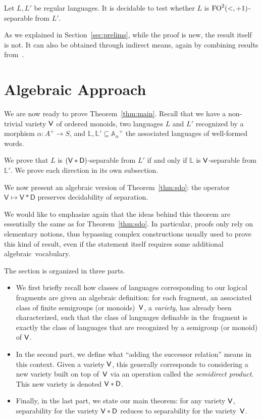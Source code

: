 \documentclass[a4paper,USenglish]{lipics}
\newcommand\Abb{\ensuremath{\mathbb{A}}\xspace}
\newcommand\Lbb{\ensuremath{\mathbb{L}}\xspace}
\newcommand\Vbf{\ensuremath{{\sf V}}\xspace}
\newcommand\Dbf{\ensuremath{{\sf D}}\xspace}
\newcommand{\fodp}{\ensuremath{\textup{FO}^2(<,+1)}\xspace}
\newcommand\wfA{\ensuremath{\Abb_\alpha}\xspace}
\theoremstyle{plain}
\begin{document}
\begin{corollary} \label{cor:dodp}
  Let $L,L'$ be regular languages. It is decidable to test whether $L$
  is \fodp-separable from $L'$.
\end{corollary}

As we explained in Section~\ref{sec:prelims}, while the proof is new, the
result itself is not. It can also be obtained through indirect means, again by
combining results from~\cite{MR1709911,Steinberg:delay-pointlikes:2001}.




\section{Algebraic Approach}
\label{sec:algebra}


\medskip We are now ready to prove Theorem~\ref{thm:main}. Recall that we have
a non-trivial variety \Vbf of ordered monoids, two languages $L$ and $L'$
recognized by a morphism $\alpha: A^+ \rightarrow S$, and $\Lbb,\Lbb'
\subseteq \wfA^+$ the associated languages of well-formed words.

We prove that $L$ is $(\Vbf * \Dbf)$-separable from $L'$ if and only if
\Lbb is \Vbf-separable from $\Lbb'$. We prove each direction in its
own subsection.




We now present an algebraic version of Theorem~\ref{thm:sdo}: the operator
$\mathsf{V} \mapsto \mathsf{V}\ast\mathsf{D}$ preserves decidability of
separation.

We would like to emphasize again that the ideas behind this theorem are
essentially the same as for Theorem~\ref{thm:sdo}. In particular, proofs only
rely on elementary notions, thus bypassing complex constructions usually used
to prove this kind of result, even if the statement itself requires some
additional algebraic~vocabulary.

\smallskip
The section is organized in three parts.
\begin{itemize}
\item We first briefly recall how classes of languages corresponding to our
  logical fragments are given an algebraic definition: for each fragment, an
  associated class of finite semigroups (or monoids)~\Vbf, a \emph{variety},
  has already been characterized, such that the class of languages definable
  in the~fragment is exactly the class of languages that are recognized by a
  semigroup (or monoid) of \Vbf.
\item In the second part, we define what ``adding
  the successor relation'' means in this context. Given a variety \Vbf, this
  generally corresponds to considering a new variety built on top of~\Vbf via
  an operation called the \emph{semidirect product}. This new variety is
  denoted $\Vbf * \Dbf$.
\item  Finally, in the last part, we state our main
  theorem: for any variety \Vbf, separability for the variety $\Vbf * \Dbf$
  reduces to separability for the variety~\Vbf.
\end{itemize}
\end{document}
